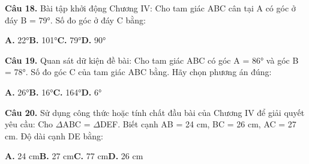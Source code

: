 \documentclass[11pt,a4paper]{article}
\begin{document}
\textbf{\color{primary} Câu 18.} Bài tập khởi động Chương IV: Cho tam giác ABC cân tại A có góc ở đáy B = 79°. Số đo góc ở đáy C bằng:\par
\hspace*{1.5em}\textbf{A.} 22°\quad\quad \textbf{B.} 101°\quad\quad \textbf{C.} 79°\quad\quad \textbf{D.} 90°\par\vspace{2pt}
\textbf{\color{primary} Câu 19.} Quan sát dữ kiện đề bài: Cho tam giác ABC có góc A = 86° và góc B = 78°. Số đo góc C của tam giác ABC bằng. Hãy chọn phương án đúng:\par
\hspace*{1.5em}\textbf{A.} 26°\quad\quad \textbf{B.} 16°\quad\quad \textbf{C.} 164°\quad\quad \textbf{D.} 6°\par\vspace{2pt}
\textbf{\color{primary} Câu 20.} Sử dụng công thức hoặc tính chất đầu bài của Chương IV để giải quyết yêu cầu: Cho $\Delta$ABC = $\Delta$DEF. Biết cạnh AB = 24 cm, BC = 26 cm, AC = 27 cm. Độ dài cạnh DE bằng:\par
\hspace*{1.5em}\textbf{A.} 24 cm\quad\quad \textbf{B.} 27 cm\quad\quad \textbf{C.} 77 cm\quad\quad \textbf{D.} 26 cm\par\vspace{2pt}
\end{document}
